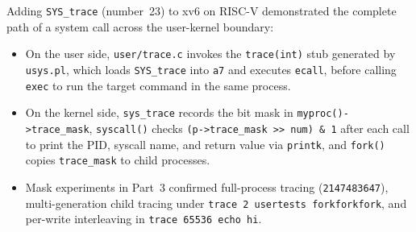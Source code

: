 \documentclass{../latex/utmreport}
\providecommand{\tightlist}{\setlength{\itemsep}{0pt}\setlength{\parskip}{0pt}}
\begin{document}
\utmconclusions

Adding \texttt{SYS\_trace} (number~23) to xv6 on RISC-V demonstrated the complete path of a system call across the user-kernel boundary:
\begin{itemize}
\tightlist
\item On the user side, \texttt{user/trace.c} invokes the \texttt{trace(int)} stub generated by \texttt{usys.pl}, which loads \texttt{SYS\_trace} into \texttt{a7} and executes \texttt{ecall}, before calling \texttt{exec} to run the target command in the same process.
\item On the kernel side, \texttt{sys\_trace} records the bit mask in \texttt{myproc()->trace\_mask}, \texttt{syscall()} checks \texttt{(p->trace\_mask >> num) \& 1} after each call to print the PID, syscall name, and return value via \texttt{printk}, and \texttt{fork()} copies \texttt{trace\_mask} to child processes.
\item Mask experiments in Part~3 confirmed full-process tracing (\texttt{2147483647}), multi-generation child tracing under \texttt{trace 2 usertests forkforkfork}, and per-write interleaving in \texttt{trace 65536 echo hi}.
\end{itemize}
\end{document}
